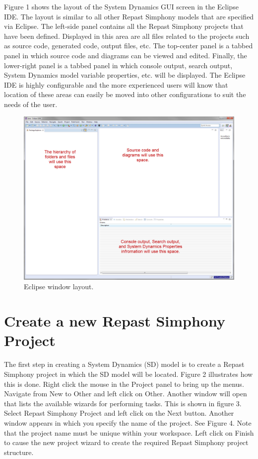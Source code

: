 \documentclass[11pt]{amsart}
\begin{document}
Figure 1 shows the layout of the System Dynamics GUI screen in the Eclipse IDE. The layout is similar to all other Repast Simphony models that are specified via Eclipse. The left-side panel contains all the Repast Simphony projects that have been defined. Displayed in this area are all files related to the projects such as source code, generated code, output files, etc. The top-center panel is a tabbed panel in which source code and diagrams can be viewed and edited. Finally, the lower-right panel is a tabbed panel in which console output, search output, System Dynamics model variable properties, etc. will be displayed. The Eclipse IDE is highly configurable and the more experienced users will know that location of these areas can easily be moved into other configurations to suit the needs of the user.\\





\begin{figure}[ht]
\begin{center}
\vspace{.2in}
\centerline {
\includegraphics[totalheight=0.5\textheight]{images/001.jpg}
}
\caption{Eclipse window layout.}
\label{fig:001}
\end{center}
\end{figure}

\section{Create a new Repast Simphony Project}
The first step in creating a System Dynamics (SD) model is to create a Repast Simphony project in which the SD model will be located. Figure 2 illustrates how this is done. Right click the mouse in the Project panel to bring up the menus. Navigate from New to Other and left click on Other. Another window will open that lists the available wizards for performing tasks. This is shown in figure 3. Select Repast Simphony Project and left click on the Next button. Another window appears in which you specify the name of the project. See Figure 4. Note that the project name must be unique within your workspace. Left click on Finish to cause the new project wizard to create the required Repast Simphony project structure.
\end{document}
